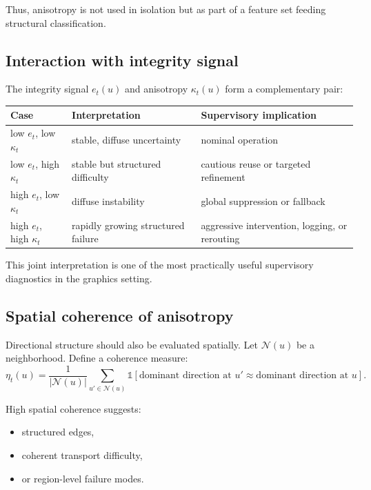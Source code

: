 \documentclass[11pt,letterpaper]{article}
\theoremstyle{gcresult}
\theoremstyle{definition}
\begin{document}
Thus, anisotropy is not used in isolation but as part of a feature set feeding structural classification.


\subsection{Interaction with integrity signal}

The integrity signal $e_t(u)$ and anisotropy $\kappa_t(u)$ form a complementary pair:

\begin{center}
\begin{tabular}{lll}
\toprule
Case & Interpretation & Supervisory implication \\
\midrule
low $e_t$, low $\kappa_t$ & stable, diffuse uncertainty & nominal operation \\
low $e_t$, high $\kappa_t$ & stable but structured difficulty & cautious reuse or targeted refinement \\
high $e_t$, low $\kappa_t$ & diffuse instability & global suppression or fallback \\
high $e_t$, high $\kappa_t$ & rapidly growing structured failure & aggressive intervention, logging, or rerouting \\
\bottomrule
\end{tabular}
\end{center}

This joint interpretation is one of the most practically useful supervisory diagnostics in the graphics setting.


\subsection{Spatial coherence of anisotropy}

Directional structure should also be evaluated spatially. Let $\mathcal{N}(u)$ be a neighborhood. Define a coherence measure:
\begin{equation}
\eta_t(u)=\frac{1}{|\mathcal{N}(u)|}\sum_{u'\in\mathcal{N}(u)}
\mathbb{1}\!\left[
\text{dominant direction at }u' \approx \text{dominant direction at }u
\right].
\end{equation}

High spatial coherence suggests:
\begin{itemize}[leftmargin=1.5em]
    \item structured edges,
    \item coherent transport difficulty,
    \item or region-level failure modes.
\end{itemize}
\end{document}
